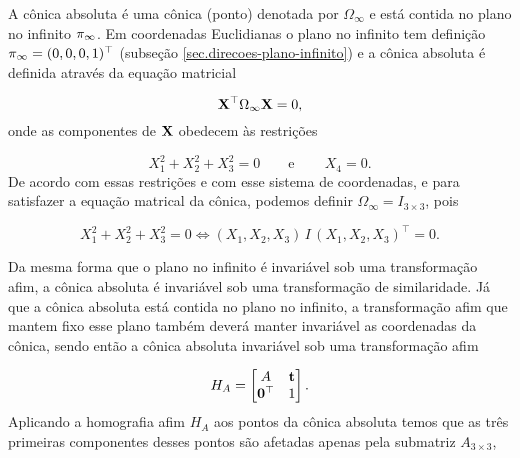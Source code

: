 A cônica absoluta é uma cônica (ponto) denotada por $\Omega_\infty$ e está contida no plano no infinito $\pi_\infty$. Em coordenadas Euclidianas o plano no infinito tem definição $\pi_\infty=(0,0,0,1)^\top$ (subseção \ref{sec.direcoes-plano-infinito}) e a cônica absoluta é definida através da equação matricial

\begin{equation*}
\mathbf{X}^\top\Omega_\infty\mathbf{X}=0,
\end{equation*} 
onde as componentes de $\mathbf{X}$ obedecem às restrições

\begin{equation*}
X_1^2+X_2^2+X_3^2=0\qquad\text{e}\qquad\,X_4=0.
\end{equation*}
De acordo com essas restrições e com esse sistema de coordenadas, e para satisfazer a equação matrical da cônica, podemos definir $\Omega_\infty=I_{3\times3}$, pois

\begin{equation*}
X_1^2+X_2^2+X_3^2=0\Leftrightarrow(X_1,X_2,X_3)\,I\,(X_1,X_2,X_3)^\top=0.
\end{equation*}

Da mesma forma que o plano no infinito é invariável sob uma transformação afim, a cônica absoluta é invariável sob uma transformação de similaridade. Já que a cônica absoluta está contida no plano no infinito, a transformação afim que mantem fixo esse plano também deverá manter invariável as coordenadas da cônica, sendo então a cônica absoluta invariável sob uma transformação afim

\begin{equation*}
H_A=
\begin{bmatrix}
A&{\bf t}\\
{\bf 0}^\top&1
\end{bmatrix}.
\end{equation*}
Aplicando a homografia afim $H_A$ aos pontos da cônica absoluta temos que as três primeiras componentes desses pontos são afetadas apenas pela submatriz $A_{3\times3}$,

